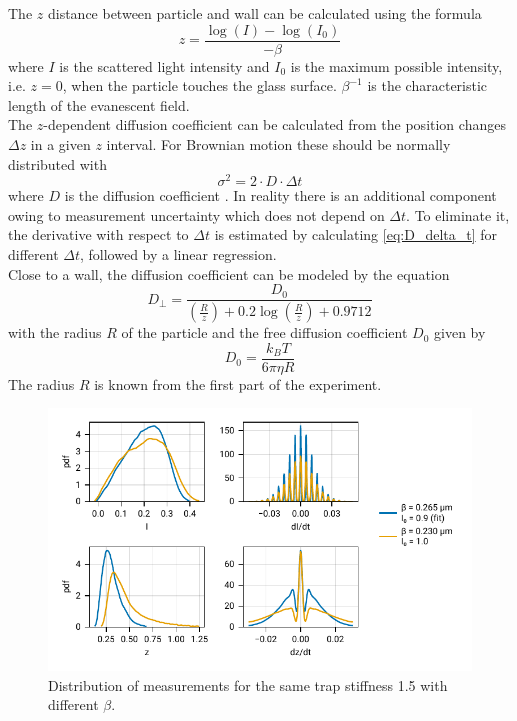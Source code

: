 \documentclass[
    twoside=false,
    twocolumn=true,
    fontsize=11pt,
]{scrarticle}
\begin{document}
The $z$ distance between particle and wall can be calculated using the formula \cite{instructions}
\begin{equation}
 \label{eq:calculate_z}
 z = \frac{\log(I) - \log(I_0)}{-\beta}
\end{equation}
where $I$ is the scattered light intensity and $I_0$ is the maximum possible intensity, i.e. $z=0$, when the particle touches the glass surface. $\beta^{-1}$ is the characteristic length of the evanescent field.\\
The $z$-dependent diffusion coefficient can be calculated from the position changes $\Delta z$ in a given $z$ interval. For Brownian motion these should be normally distributed with
\begin{equation}
\label{eq:D_delta_t}
 \sigma^2 = 2 \cdot D \cdot \Delta t
\end{equation}
where $D$ is the diffusion coefficient \cite{instructions}. In reality there is an additional component owing to measurement uncertainty which does not depend on $\Delta t$. To eliminate it, the derivative with respect to $\Delta t$ is estimated by calculating \autoref{eq:D_delta_t} for different $\Delta t$, followed by a linear regression.\\
Close to a wall, the diffusion coefficient can be modeled \cite{instructions} by the equation
\begin{equation}
 \label{eq:D_Brenner_approx}
 D_\bot = \frac{D_0}{\left(\frac{R}{z}\right) + 0.2 \log\left(\frac{R}{z}\right) + 0.9712}
\end{equation}
with the radius $R$ of the particle and the free diffusion coefficient $D_0$ given by \cite{instructions}
\begin{equation}
 \label{eq:D_0}
 D_0 = \frac{k_B T}{6 \pi \eta R}
\end{equation}
The radius $R$ is known from the first part of the experiment.


\begin{figure}
    \centering
    \includegraphics{figures/02_04_02_hist.pdf}
    \caption{Distribution of measurements for the same trap stiffness \SI{1.5}{} with different $\beta$.}
\end{figure}
\end{document}
